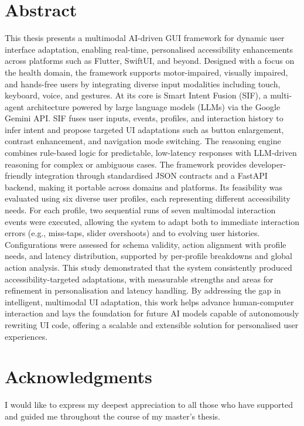 \documentclass[openany]{book}
\begin{document}
\chapter*{Abstract}
This thesis presents a multimodal AI-driven GUI framework for dynamic user interface adaptation, enabling real-time, personalised accessibility enhancements across platforms such as Flutter, SwiftUI, and beyond. Designed with a focus on the health domain, the framework supports motor-impaired, visually impaired, and hands-free users by integrating diverse input modalities including touch, keyboard, voice, and gestures.
At its core is Smart Intent Fusion (SIF), a multi-agent architecture powered by large language models (LLMs) via the Google Gemini API. SIF fuses user inputs, events, profiles, and interaction history to infer intent and propose targeted UI adaptations such as button enlargement, contrast enhancement, and navigation mode switching. The reasoning engine combines rule-based logic for predictable, low-latency responses with LLM-driven reasoning for complex or ambiguous cases.
The framework provides developer-friendly integration through standardised JSON contracts and a FastAPI backend, making it portable across domains and platforms. Its feasibility was evaluated using six diverse user profiles, each representing different accessibility needs. For each profile, two sequential runs of seven multimodal interaction events were executed, allowing the system to adapt both to immediate interaction errors (e.g., miss-taps, slider overshoots) and to evolving user histories. Configurations were assessed for schema validity, action alignment with profile needs, and latency distribution, supported by per-profile breakdowns and global action analysis. This study demonstrated that the system consistently produced accessibility-targeted adaptations, with measurable strengths and areas for refinement in personalisation and latency handling.
By addressing the gap in intelligent, multimodal UI adaptation, this work helps advance human-computer interaction and lays the foundation for future AI models capable of autonomously rewriting UI code, offering a scalable and extensible solution for personalised user experiences.

\chapter*{Acknowledgments}
I would like to express my deepest appreciation to all those who have supported and guided me throughout the course of my master’s thesis.
\end{document}
